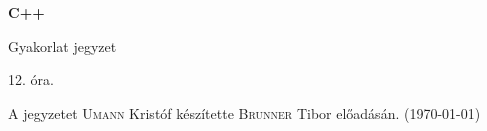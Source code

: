 \documentclass[a4paper,11.5pt]{article}
\begin{document}
	\setlength\parindent{0pt}
	\def\s{\hspace{0.2mm}\vphantom{\beta}}
	\def\Z{\mathbb{Z}}
	\def\Q{\mathbb{Q}}
	\def\R{\mathbb{R}}
	\def\C{\mathbb{C}}
	\def\N{\mathbb{N}}
	\def\Ra{\overline{\mathbb{R}}}
	
	\def\sume{\displaystyle\sum_{n=1}^{+\infty}}
	\def\sumn{\displaystyle\sum_{n=0}^{+\infty}}
	
	\def\narrow{\underset{n\rightarrow+\infty}{\longrightarrow}}
	\def\limn{\displaystyle\lim_{n\to +\infty}}
	\def\limx{\displaystyle\lim_{x\to +\infty}}
	
	\theoremstyle{definition}
	\newtheorem{theorem}{Tétel}[subsection] 
	
	\theoremstyle{definition}
	\newtheorem{definition}[theorem]{Definíció} 
	\newtheorem{example}[theorem]{Példa} 
	\newtheorem{task}[theorem]{Feladat} 
	\newtheorem{note}[theorem]{Megjegyzés}
	\begin{center}
		{\LARGE\textbf{C++}}
		
		{\Large Gyakorlat jegyzet}
		
		12. óra.
	\end{center}
	A jegyzetet \textsc{Umann} Kristóf készítette \textsc{Brunner} Tibor  előadásán. (\today)
	\medskip
	
\end{document}
